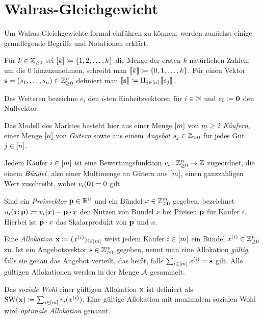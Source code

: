 \section{Walras-Gleichgewicht}

Um Walras-Gleichgewichte formal einführen zu können, werden zunächst einige grundlegende Begriffe und Notationen erklärt.

\begin{notation}
	Für $k\in\mathbb{Z}_{\geq 0}$ sei $\left[ k \right]\coloneqq \{ 1, 2, \dots, k \}$ die Menge der ersten $k$ natürlichen Zahlen; um die $0$ hinzuzunehmen, schreibt man $\left\llbracket k \right\rrbracket\coloneqq \{0,1,\dots, k \}$.
	Für einen Vektor $\mathbf{s} = (s_1, \dots, s_n)\in\mathbb{Z}_{\geq0}^n$ definiert man $\left\llbracket \mathbf{s} \right\rrbracket\coloneqq \Pi_{j\in\left[ n \right]} \left\llbracket s_j \right\rrbracket$.
	
	Des Weiteren bezeichne $e_i$ den $i$-ten Einheitsvektoren für $i\in\mathbb{N}$ und $e_0 \coloneqq \mathbf{0}$ den Nullvektor. 
\end{notation}

Das Modell des Marktes besteht hier aus einer Menge $\left[ m \right]$ von $m\geq 2$ \emph{Käufern}, einer Menge $\left[ n \right]$ von \emph{Gütern} sowie aus einem \emph{Angebot} $s_j\in\mathbb{Z}_{>0}$ für jedes Gut $j\in\left[ n \right]$.

Jedem Käufer $i\in\left[ m \right]$ ist eine Bewertungsfunktion $v_i:\mathbb{Z}^n_{\geq 0} \rightarrow \mathbb{Z}$ zugeordnet, die einem $\emph{Bündel}$, also einer Multimenge an Gütern aus $\left[ m \right]$, einen ganzzahligen Wert zuschreibt, wobei $v_i(\mathbf{0}) = 0$ gilt.

Sind ein \emph{Preisvektor} $\mathbf{p}\in\mathbb{R}^n$ und ein Bündel $x\in\mathbb{Z}^{m}_{\geq0}$ gegeben, bezeichnet $u_i(x;\fp) \coloneqq v_i(x) - \fp \bcdot x$ den Nutzen von Bündel $x$ bei Preisen $\mathbf{p}$ für Käufer $i$.
Hierbei ist $\mathbf{p} \cdot x$ das Skalarprodukt von $\mathbf{p}$ und $x$.

\begin{definition}[Allokation]
	Eine \emph{Allokation} $\mathbf{x}\coloneqq (x^{(i)})_{i\in\left[ m \right]}$ weist jedem Käufer $i\in\left[ m \right]$ ein Bündel $x^{(i)} \in\mathbb{Z}^n_{\geq0}$ zu.
	Ist ein Angebotsvektor $\mathbf{s}\in\mathbb{Z}^m_{\geq0}$ gegeben, nennt man eine Allokation \emph{gültig}, falls sie genau das Angebot verteilt, das heißt, falls $\sum_{i\in\left[ m \right]} x^{(i)} = \mathbf{s}$ gilt.
	Alle gültigen Allokationen werden in der Menge $\operatorname{\mathcal{A}}$ gesammelt.
	
	Das \emph{soziale Wohl} einer gültigen Allokation $\mathbf{x}$ ist definiert als $\operatorname{SW}(\mathbf{x}) \coloneqq \sum_{i\in\left[ m \right]} v_i(x^{(i)})$.
	Eine gültige Allokation mit maximalem sozialen Wohl wird \emph{optimale Allokation} genannt.
\end{definition}

